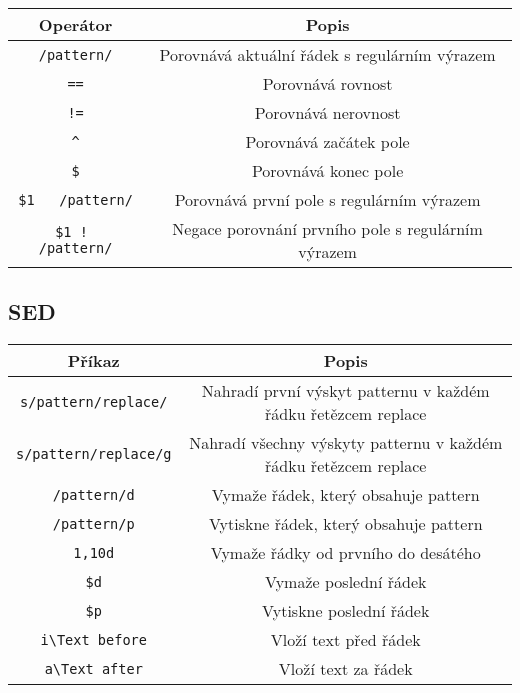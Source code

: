 \documentclass{article}
\begin{document}
\begin{center}
\begin{tabular}{|c|c|}
\hline
\textbf{Operátor} & \textbf{Popis} \\
\hline
\texttt{/pattern/} & Porovnává aktuální řádek s regulárním výrazem \\
\texttt{==} & Porovnává rovnost \\
\hline
\texttt{!=} & Porovnává nerovnost \\
\hline
\texttt{\^} & Porovnává začátek pole \\
\hline
\texttt{\$} & Porovnává konec pole \\
\hline
\texttt{\$1 ~ /pattern/} & Porovnává první pole s regulárním výrazem \\
\hline
\texttt{\$1 !~ /pattern/} & Negace porovnání prvního pole s regulárním výrazem \\
\hline
\end{tabular}
\end{center}
\subsection{SED}
\begin{center}
\begin{tabular}{|c|c|}
\hline
\textbf{Příkaz} & \textbf{Popis} \\
\hline
\texttt{s/pattern/replace/} & Nahradí první výskyt patternu v každém řádku řetězcem replace \\
\hline
\texttt{s/pattern/replace/g} & Nahradí všechny výskyty patternu v každém řádku řetězcem replace \\
\hline
\texttt{/pattern/d} & Vymaže řádek, který obsahuje pattern \\
\hline
\texttt{/pattern/p} & Vytiskne řádek, který obsahuje pattern \\
\hline
\texttt{1,10d} & Vymaže řádky od prvního do desátého \\
\hline
\texttt{\$d} & Vymaže poslední řádek \\
\hline
\texttt{\$p} & Vytiskne poslední řádek \\
\hline
\texttt{i\textbackslash{}Text before} & Vloží text před řádek \\
\hline
\texttt{a\textbackslash{}Text after} & Vloží text za řádek \\
\hline
\end{tabular}
\end{center}
\end{document}
